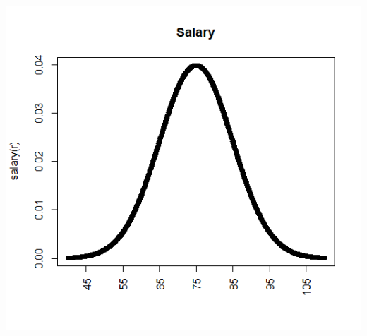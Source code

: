 \documentclass[letterpaper, onecolumn,10pt]{IEEEtran}
\begin{document}
                \includegraphics{plot}
                
                
\end{document}
